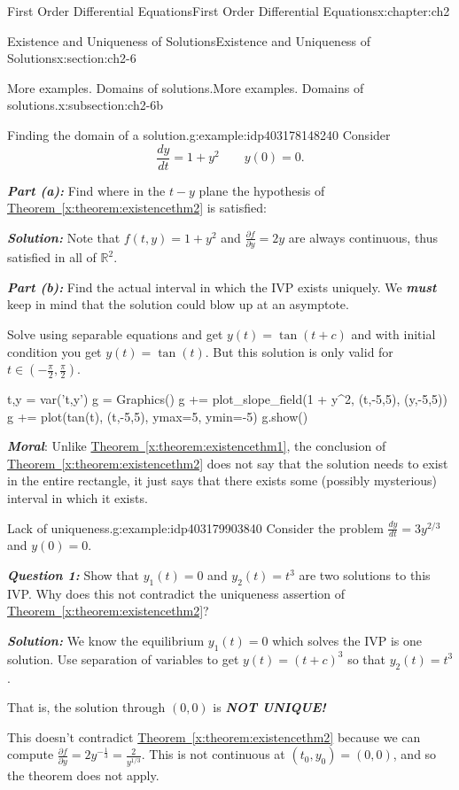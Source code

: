 \documentclass[oneside,10pt,]{book}
\newcommand{\xreffont}{\relax}
\newcommand{\alert}[1]{\textbf{\textit{#1}}}
\numberwithin{equation}{section}
\numberwithin{equation}{section}
\begin{document}
\begin{chapterptx}{First Order Differential Equations}{}{First Order Differential Equations}{}{}{x:chapter:ch2}
\begin{sectionptx}{Existence and Uniqueness of Solutions}{}{Existence and Uniqueness of Solutions}{}{}{x:section:ch2-6}
\begin{subsectionptx}{More examples. Domains of solutions.}{}{More examples. Domains of solutions.}{}{}{x:subsection:ch2-6b}
\begin{example}{Finding the domain of a solution.}{g:example:idp403178148240}
Consider%
\begin{equation*}
\frac{dy}{dt}=1+y^{2}\qquad y(0)=0.
\end{equation*}
%
\par
\alert{Part (a):} Find where in the \(t-y\) plane the hypothesis of \hyperref[x:theorem:existencethm2]{Theorem~{\xreffont\ref{x:theorem:existencethm2}}} is satisfied:%
\par
\alert{Solution:} Note that \(f(t,y)=1+y^{2}\) and \(\frac{\partial f}{\partial y}=2y\) are always continuous, thus satisfied in all of \(\mathbb{R}^{2}\).%
\par
\alert{Part (b):} Find the actual interval in which the IVP exists uniquely. We \alert{must} keep in mind that the solution could blow up at an asymptote.%
\par
Solve using separable equations and get \(y(t)=\tan(t+c)\) and with initial condition you get \(y(t)=\tan(t)\). But this solution is only valid for \(t\in\left(-\frac{\pi}{2},\frac{\pi}{2}\right)\).%
\begin{sageinput}
t,y = var('t,y')
g = Graphics()
g += plot_slope_field(1 + y^2, (t,-5,5), (y,-5,5))
g += plot(tan(t), (t,-5,5), ymax=5, ymin=-5)
g.show()
\end{sageinput}
\alert{Moral}: Unlike \hyperref[x:theorem:existencethm1]{Theorem~{\xreffont\ref{x:theorem:existencethm1}}}, the conclusion of \hyperref[x:theorem:existencethm2]{Theorem~{\xreffont\ref{x:theorem:existencethm2}}} does not say that the solution needs to exist in the entire rectangle, it just says that there exists some (possibly mysterious) interval in which it exists.%
\end{example}
\begin{example}{Lack of uniqueness.}{g:example:idp403179903840}%
Consider the problem \(\frac{dy}{dt}=3y^{2/3}\) and \(y(0)=0\).%
\par
\alert{Question 1:} Show that \(y_{1}(t)=0\) and \(y_{2}(t)=t^{3}\) are two solutions to this IVP. Why does this not contradict the uniqueness assertion of \hyperref[x:theorem:existencethm2]{Theorem~{\xreffont\ref{x:theorem:existencethm2}}}?%
\par
\alert{Solution:} We know the equilibrium \(y_{1}(t)=0\) which solves the IVP is one solution. Use separation of variables to get \(y(t)=(t+c)^{3}\) so that \(y_{2}(t)=t^{3}\).%
\par
That is, the solution through \((0,0)\) is \alert{NOT UNIQUE!}%
\par
This doesn't contradict \hyperref[x:theorem:existencethm2]{Theorem~{\xreffont\ref{x:theorem:existencethm2}}} because we can compute \(\frac{\partial f}{\partial y}=2y^{-\frac{1}{3}}=\frac{2}{y^{1/3}}\). This is not continuous at \((t_{0},y_{0})=(0,0)\), and so the theorem does not apply.%

\end{example}
\end{subsectionptx}
\end{sectionptx}
\end{chapterptx}
\end{document}
